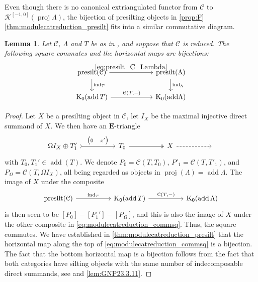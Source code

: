 \documentclass[10pt,twoside, a4paper,reqno]{amsart}
\DeclareMathOperator{\presilt}{presilt}
\DeclareMathOperator{\add}{add}
\DeclareMathOperator{\proj}{proj}
\DeclareMathOperator{\ind}{ind}
\newcommand{\Ktwo}{\mathcal{K}^{[-1,0]}}
\newcommand{\calC}{\mathcal{C}}
\newcommand{\E}{\mathbf{E}}
\newcommand{\K}{\mathrm{K}}
\newtheorem{lemma}[theorem]{Lemma}
\theoremstyle{definition}
\begin{document}
        Even though there is no canonical extriangulated functor from $\calC$ to $\Ktwo(\proj \Lambda)$, the bijection of presilting objects in \cref{prop:F}\eqref{thm:modulecatreduction_presilt} fits into a similar commutative diagram.

\begin{lemma}\label{lem:Findexsquare}
Let $\calC$, $\Lambda$ and $T$ be as in , and suppose that $\calC$ is reduced. The following square commutes and the horizontal maps are bijections:\begin{equation}\label{eq:modulecatreduction_commsq}
    \begin{tikzcd}[column sep=6em]
        \presilt(\calC) \arrow[d," \ind_T"] \arrow[r,"{\eqref{eq:presilt_C_Lambda}}"] & {\presilt( \Lambda)} \arrow[d,"\ind_{\Lambda} "] \\
        \K_0(\add{T})  \arrow[r,"{\calC(T,-)}"] & \K_0({\add}{\Lambda})
    \end{tikzcd}
    \end{equation}
    \end{lemma}
    \begin{proof}
        Let $X$ be a presilting object in $\calC$, let $I_X$ be the maximal injective direct summand of $X$. We then have an $\E$-triangle
    \begin{equation*}
        \begin{tikzcd}[column sep=5em,ampersand replacement=\&]
           \Omega I_X \oplus T'_1 \arrow[r,"{\begin{pmatrix}
               0 & x'
           \end{pmatrix}}", tail] \& T_0 \arrow[r,two heads] \& X \arrow[r, dashed] \& {}
        \end{tikzcd}
    \end{equation*}
    {with ${T_0, T_1'} \in \add(T)$.}
    We denote $P_0 = \calC(T,T_0)$, $P'_1 = \calC(T,T'_1)$, and $P_{\Omega} = \calC(T,\Omega I_X)$, all being regarded as objects in $\proj(\Lambda){= \add \Lambda}$. The image of $X$ under the composite
    \begin{equation*}
        \begin{tikzcd}[column sep=5em]
            \presilt(\calC)\arrow[r,"\ind_T"] & \K_0(\add{T}) \arrow[r,"{\calC(T,-)}"] & \K_0(\add{\Lambda})
        \end{tikzcd}
    \end{equation*}
    is then seen to be $[P_0]-[P_1']-[P_{\Omega}]$, and this is also the image of $X$ under the other composite in \eqref{eq:modulecatreduction_commsq}. Thus, the square commutes. We have established in {\eqref{thm:modulecatreduction_presilt}} that the horizontal map along the top of \eqref{eq:modulecatreduction_commsq} is a bijection. The fact that the bottom horizontal map is a bijection follows from the fact that both categories have silting objects with the same number of indecomposable direct summands, see \cite[Thm. 4.1]{AT23} and \cref{lem:GNP23.3.11}.
    \end{proof}
\end{document}
